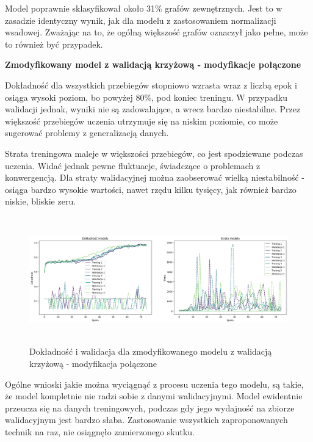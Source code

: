 Model poprawnie sklasyfikował około 31\% grafów zewnętrznych.
Jest to w zasadzie identyczny wynik, jak dla modelu z zastosowaniem normalizacji wsadowej.
Zważając na to, że ogólną większość grafów oznaczył jako pełne, może to również być przypadek.

\textbf{Zmodyfikowany model z walidacją krzyżową - modyfikacje połączone}

Dokładność dla wszystkich przebiegów stopniowo wzrasta wraz z liczbą epok
i osiąga wysoki poziom, bo powyżej 80\%, pod koniec treningu.
W przypadku walidacji jednak, wyniki nie są zadowalające, a wrecz bardzo niestabilne.
Przez większość przebiegów uczenia utrzymuje się na niskim poziomie,
co może sugerować problemy z generalizacją danych.

Strata treningowa maleje w większości przebiegów, co jest spodziewane podczas uczenia.
Widać jednak pewne fluktuacje, świadczące o problemach z konwergencją.
Dla straty walidacyjnej można zaobserować wielką niestabilność - osiąga bardzo wysokie wartości,
nawet rzędu kilku tysięcy, jak również bardzo niskie, bliskie zeru.

\begin{figure}[ht]
	\centering
	\includegraphics[height=5.5cm]{resources/tests/images/v4/crossvalid_img.png}
	\caption{Dokładność i walidacja dla zmodyfikowanego modelu z walidacją krzyżową - modyfikacja połączone}
	\label{Fig:tests-cv-5a}
\end{figure}
\FloatBarrier

Ogólne wnioski jakie można wyciągnąć z procesu uczenia tego modelu,
są takie, że model kompletnie nie radzi sobie z danymi walidacyjnymi.
Model ewidentnie przeucza się na danych treningowych,
podczas gdy jego wydajność na zbiorze walidacyjnym jest bardzo słaba.
Zastosowanie wszystkich zaproponowanych technik na raz,
nie osiągnęło zamierzonego skutku. 

